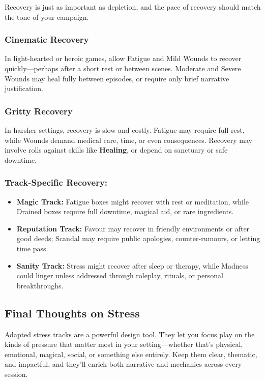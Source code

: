 Recovery is just as important as depletion, and the pace of recovery should match the tone of your campaign.

\subsubsection{Cinematic Recovery}
In light-hearted or heroic games, allow Fatigue and Mild Wounds to recover quickly—perhaps after a short rest or between scenes. Moderate and Severe Wounds may heal fully between episodes, or require only brief narrative justification.
    
\subsubsection{Gritty Recovery} In harsher settings, recovery is slow and costly. Fatigue may require full rest, while Wounds demand medical care, time, or even consequences. Recovery may involve rolls against skills like \textbf{Healing}, or depend on sanctuary or safe downtime.

\subsubsection{Track-Specific Recovery:} 
    \begin{itemize}
        \item \textbf{Magic Track:} Fatigue boxes might recover with rest or meditation, while Drained boxes require full downtime, magical aid, or rare ingredients.
        \item \textbf{Reputation Track:} Favour may recover in friendly environments or after good deeds; Scandal may require public apologies, counter-rumours, or letting time pass.
        \item \textbf{Sanity Track:} Stress might recover after sleep or therapy, while Madness could linger unless addressed through roleplay, rituals, or personal breakthroughs.
    \end{itemize}

\subsection*{Final Thoughts on Stress}

Adapted stress tracks are a powerful design tool. They let you focus play on the kinds of pressure that matter most in your setting—whether that’s physical, emotional, magical, social, or something else entirely. Keep them clear, thematic, and impactful, and they’ll enrich both narrative and mechanics across every session.